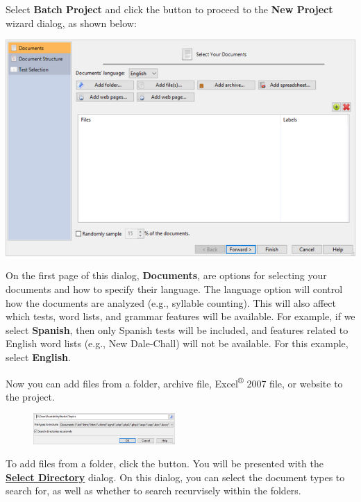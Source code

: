 \documentclass[
]{book}
\theoremstyle{definition}
\theoremstyle{definition}
\theoremstyle{definition}
\theoremstyle{definition}
\theoremstyle{remark}
\begin{document}
Select \textbf{Batch Project} and click the  button to proceed to the \textbf{New Project} wizard dialog, as shown below:

\includegraphics{Images/wizardbatchselectfiles.png}

On the first page of this dialog, \textbf{Documents}, are options for selecting your documents and how to specify their language. The language option will control how the documents are analyzed (e.g., syllable counting). This will also affect which tests, word lists, and grammar features will be available. For example, if we select \textbf{Spanish}, then only Spanish tests will be included, and features related to English word lists (e.g., New Dale-Chall) will not be available. For this example, select \textbf{English}.

Now you can add files from a folder, archive file, Excel\textsuperscript{®} 2007 file, or website to the project.

\begin{figure}
\includegraphics[width=0.48\textwidth,height=\textheight]{Images/selectdirectory.png}

\end{figure}

To add files from a folder, click the  button. You will be presented with the \protect\hyperlink{select-directory}{\textbf{Select Directory}} dialog. On this dialog, you can select the document types to search for, as well as whether to search recurvisely within the folders.
\end{document}
